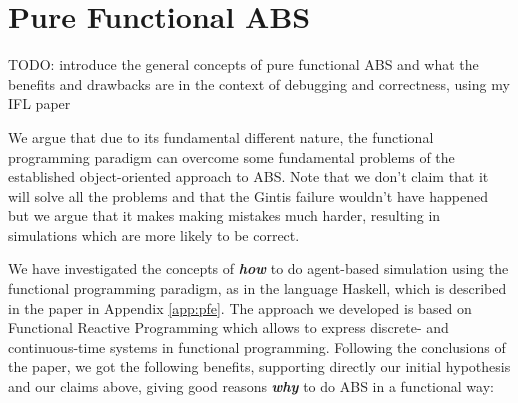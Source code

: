 \section{Pure Functional ABS}
TODO: introduce the general concepts of pure functional ABS and what the benefits and drawbacks are in the context of debugging and correctness, using my IFL paper

We argue that due to its fundamental different nature, the functional programming paradigm can overcome some fundamental problems of the established object-oriented approach to ABS. Note that we don't claim that it will solve all the problems and that the Gintis failure wouldn't have happened but we argue that it makes making mistakes much harder, resulting in simulations which are more likely to be correct.

We have investigated the concepts of \textbf{\textit{how}} to do agent-based simulation using the functional programming paradigm, as in the language Haskell, which is described in the paper in Appendix \ref{app:pfe}. The approach we developed is based on Functional Reactive Programming which allows to express discrete- and continuous-time systems in functional programming. Following the conclusions of the paper, we got the following benefits, supporting directly our initial hypothesis and our claims above, giving good reasons \textbf{\textit{why}} to do ABS in a functional way:

